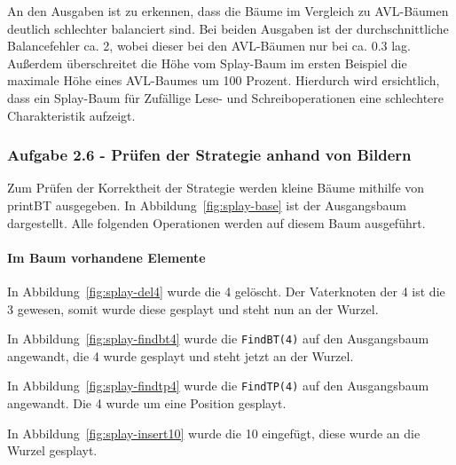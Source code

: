 An den Ausgaben ist zu erkennen, dass die Bäume im Vergleich zu AVL-Bäumen deutlich schlechter
balanciert sind.
Bei beiden Ausgaben ist der durchschnittliche Balancefehler ca. 2, wobei dieser bei den
AVL-Bäumen nur bei ca. 0.3 lag.
Außerdem überschreitet die Höhe vom Splay-Baum im ersten Beispiel die maximale Höhe eines AVL-Baumes
um 100 Prozent.
Hierdurch wird ersichtlich, dass ein Splay-Baum für Zufällige Lese- und Schreiboperationen eine
schlechtere Charakteristik aufzeigt.

\subsubsection{Aufgabe 2.6 - Prüfen der Strategie anhand von Bildern}
Zum Prüfen der Korrektheit der Strategie werden kleine Bäume mithilfe von printBT ausgegeben.
In Abbildung~\ref{fig:splay-base} ist der Ausgangsbaum dargestellt.
Alle folgenden Operationen werden auf diesem Baum ausgeführt.

\paragraph{Im Baum vorhandene Elemente}
In Abbildung~\ref{fig:splay-del4} wurde die 4 gelöscht.
Der Vaterknoten der 4 ist die 3 gewesen, somit wurde diese gesplayt und steht nun an der Wurzel.

In Abbildung~\ref{fig:splay-findbt4} wurde die \verb|FindBT(4)| auf den Ausgangsbaum angewandt,
die 4 wurde gesplayt und steht jetzt an der Wurzel.

In Abbildung~\ref{fig:splay-findtp4} wurde die \verb|FindTP(4)| auf den Ausgangsbaum angewandt.
Die 4 wurde um eine Position gesplayt.

In Abbildung~\ref{fig:splay-insert10} wurde die 10 eingefügt, diese wurde an die Wurzel gesplayt.

